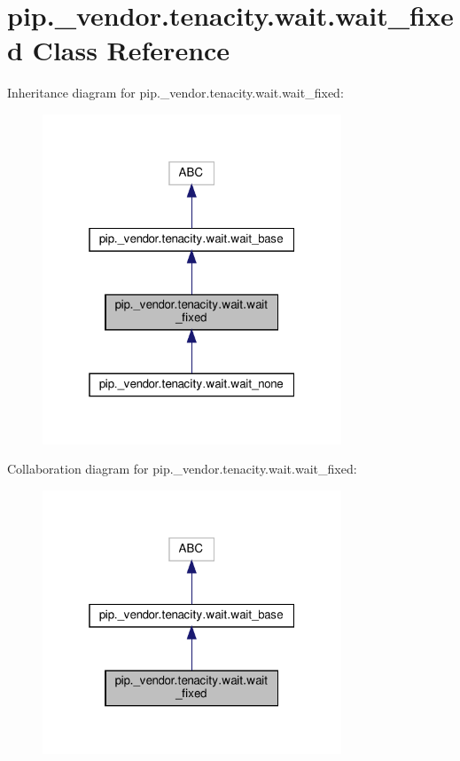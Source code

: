 \hypertarget{classpip_1_1__vendor_1_1tenacity_1_1wait_1_1wait__fixed}{}\section{pip.\+\_\+vendor.\+tenacity.\+wait.\+wait\+\_\+fixed Class Reference}
\label{classpip_1_1__vendor_1_1tenacity_1_1wait_1_1wait__fixed}


Inheritance diagram for pip.\+\_\+vendor.\+tenacity.\+wait.\+wait\+\_\+fixed\+:
\nopagebreak
\begin{figure}[H]
\begin{center}
\leavevmode
\includegraphics[width=253pt]{classpip_1_1__vendor_1_1tenacity_1_1wait_1_1wait__fixed__inherit__graph}
\end{center}
\end{figure}


Collaboration diagram for pip.\+\_\+vendor.\+tenacity.\+wait.\+wait\+\_\+fixed\+:
\nopagebreak
\begin{figure}[H]
\begin{center}
\leavevmode
\includegraphics[width=253pt]{classpip_1_1__vendor_1_1tenacity_1_1wait_1_1wait__fixed__coll__graph}
\end{center}
\end{figure}
